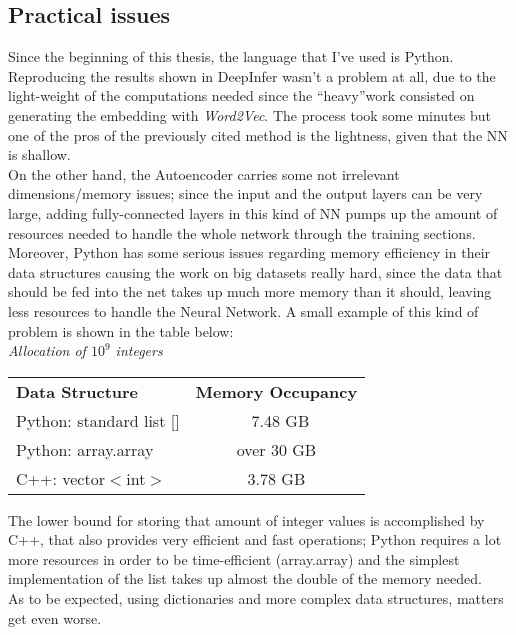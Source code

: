 \documentclass{article}
\begin{document}
			\subsection{Practical issues}
			Since the beginning of this thesis, the language that I've used is Python. Reproducing the results shown in DeepInfer wasn't a problem at all, due to the light-weight of the computations needed since the \textquotedblleft heavy\textquotedblright work consisted on generating the embedding with \textit{Word2Vec}. The process took some minutes but one of the pros of the previously cited method is the lightness, given that the NN is shallow.\\
			On the other hand, the Autoencoder carries some not irrelevant dimensions/memory issues; since the input and the output layers can be very large, adding fully-connected layers in this kind of NN pumps up the amount of resources needed to handle the whole network through the training sections.\\
			Moreover, Python has some serious issues regarding memory efficiency in their data structures causing the work on big datasets really hard, since the data that should be fed into the net takes up much more memory than it should, leaving less resources to handle the Neural Network. A small example of this kind of problem is shown in the table below:\bigskip \\
			\textit{Allocation of $10^{9}$ integers}\\
			\vspace{0.8cm}
			\begin{centering}
				\begin{tabular}{l | c}
					\textbf{Data Structure} & \textbf{Memory Occupancy}\\
					Python: standard list [] & ~7.48 GB \\
					Python: array.array & over 30 GB\\
					C++: vector$<$int$>$ & 3.78 GB
				\end{tabular}
			\end{centering}
			\newline
			The lower bound for storing that amount of integer values is accomplished by C++, that also provides very efficient and fast operations; Python requires a lot more resources in order to be time-efficient (array.array) and the simplest implementation of the list takes up almost the double of the memory needed.\\
			As to be expected, using dictionaries and more complex data structures, matters get even worse.\smallskip\\
\end{document}
